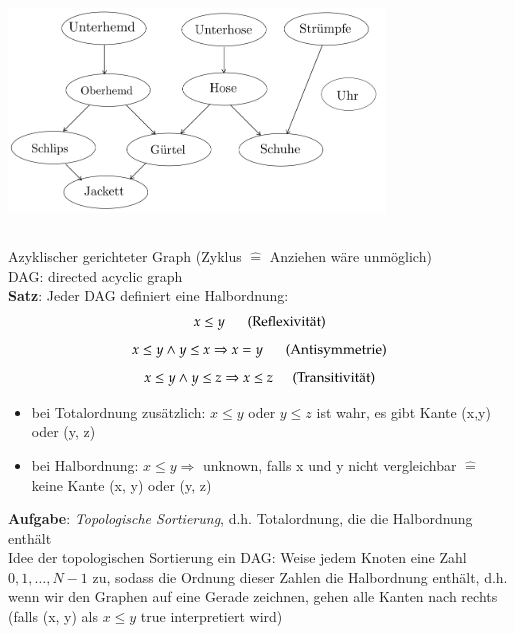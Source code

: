     \includegraphics[width=10cm,height=7cm,keepaspectratio]{./Pictures/Anziehen.png}\\
    Azyklischer gerichteter Graph (Zyklus $\widehat{=}$ Anziehen wäre unmöglich) \\
    DAG: directed acyclic graph\\

    \textbf{Satz}: Jeder DAG definiert eine Halbordnung:
    \[ x \leq y \hspace*{5mm}\text{ (Reflexivität)}\]
    \[ x \leq y \land y \leq x \Rightarrow x = y\hspace*{5mm} \text{ (Antisymmetrie)}\]
    \[ x \leq y \land y \leq z \Rightarrow x \leq z \hspace*{5mm} \text{(Transitivität)}\]

    \begin{itemize}[label={}]
        \item bei Totalordnung zusätzlich: $x\leq y$ oder $y \leq z$ ist wahr, es gibt Kante (x,y) oder (y, z)
        \item   bei Halbordnung: $x \leq y \Rightarrow$ \glqq unknown\grqq , falls x und y nicht vergleichbar $\widehat{=}$ keine Kante (x, y) oder (y, z)
    \end{itemize}



    \textbf{Aufgabe}: \emph{Topologische Sortierung}, d.h. Totalordnung, die die Halbordnung enthält\\

    Idee der topologischen Sortierung ein DAG: Weise jedem Knoten eine Zahl $0, 1, \dots, N-1$ zu, sodass die Ordnung dieser Zahlen die Halbordnung enthält, d.h. wenn wir den Graphen auf eine Gerade zeichnen, gehen alle Kanten nach rechts (falls (x, y) als $x \leq y$ true interpretiert wird)\\

